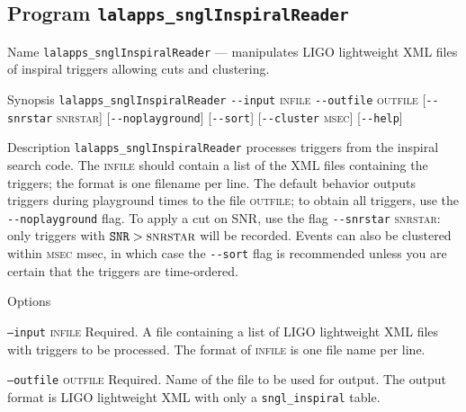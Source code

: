 %
% 
\clearpage
\subsection{Program \texttt{lalapps\_snglInspiralReader}}
\label{program:lalapps-snglInspiralReader}

\begin{entry}
\item[Name]
\verb$lalapps_snglInspiralReader$ --- manipulates LIGO lightweight XML
files of inspiral triggers allowing cuts and clustering.

\item[Synopsis]
\verb$lalapps_snglInspiralReader$ 
\verb$--input$ \textsc{infile} \verb$--outfile$ \textsc{outfile}     
[\verb$--snrstar$ \textsc{snrstar}] [\verb$--noplayground$] 
[\verb$--sort$] [\verb$--cluster$ \textsc{msec}] [\verb$--help$]

\item[Description] 
\verb$lalapps_snglInspiralReader$ processes triggers from the inspiral
search code.   The \textsc{infile} should contain a list of the XML
files containing the triggers;  the format is one filename per line.
The default behavior outputs triggers during playground
times to the file \textsc{outfile};  to obtain all triggers,  use the 
\verb$--noplayground$ flag.    To apply a cut on SNR,  use the flag 
\verb$--snrstar$ \textsc{snrstar}:  only triggers with $\texttt{SNR} 
> \textsc{snrstar}$ will be recorded.    Events can also be clustered
within \textsc{msec} msec,   in which case the \verb$--sort$ flag is
recommended unless you are certain that the triggers are time-ordered.

\item[Options]\leavevmode
\begin{entry}
\item[\texttt{--input} \textsc{infile}] Required.  A file containing a
list of LIGO lightweight XML files with triggers to be processed.  The
format of \textsc{infile} is one file name per line.

\item[\texttt{--outfile} \textsc{outfile}] Required.  Name of the file
to be used for output.  The output format is LIGO lightweight XML with
only a \texttt{sngl\_inspiral} table.


\end{entry}
\end{entry}

